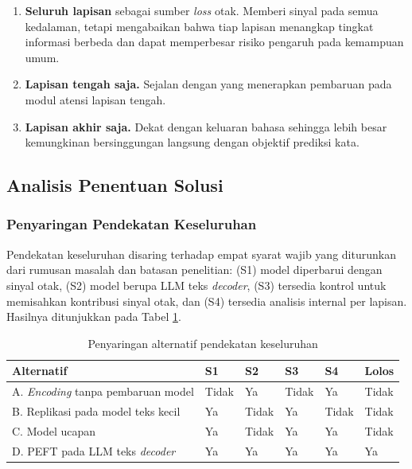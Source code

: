   \begin{enumerate}
      \item \textbf{Seluruh lapisan} sebagai sumber \textit{loss} otak. Memberi sinyal pada semua kedalaman, tetapi mengabaikan bahwa tiap lapisan menangkap tingkat informasi berbeda dan dapat memperbesar risiko pengaruh pada kemampuan umum.
      \item \textbf{Lapisan tengah saja.} Sejalan dengan \textcite{xiao2026beyond} yang menerapkan pembaruan pada modul atensi lapisan tengah.
      \item \textbf{Lapisan akhir saja.} Dekat dengan keluaran bahasa sehingga lebih besar kemungkinan bersinggungan langsung dengan objektif prediksi kata.
  \end{enumerate}

  \subsection{Analisis Penentuan Solusi}
  \label{sub:am_penentuan}

  \subsubsection{Penyaringan Pendekatan Keseluruhan}

  Pendekatan keseluruhan disaring terhadap empat syarat wajib yang diturunkan dari rumusan masalah dan batasan penelitian: (S1) model diperbarui dengan sinyal otak, (S2) model berupa LLM teks \textit{decoder}, (S3) tersedia kontrol untuk memisahkan kontribusi sinyal otak, dan (S4) tersedia analisis internal per lapisan. Hasilnya ditunjukkan pada Tabel \ref{tab:am_saring}.

  \begin{table}[h]
    \centering
    \caption{Penyaringan alternatif pendekatan keseluruhan}
    \label{tab:am_saring}
    \small
    \begin{tabularx}{\textwidth}{p{6cm} | X | X | X | X | X}
      \hline
      \textbf{Alternatif} & \textbf{S1} & \textbf{S2} & \textbf{S3} & \textbf{S4} & \textbf{Lolos} \\
      \hline
      A. \textit{Encoding} tanpa pembaruan model & Tidak & Ya & Tidak & Ya & Tidak \\
      B. Replikasi pada model teks kecil & Ya & Tidak & Ya & Tidak & Tidak \\
      C. Model ucapan & Ya & Tidak & Ya & Ya & Tidak \\
      D. PEFT pada LLM teks \textit{decoder} & Ya & Ya & Ya & Ya & Ya \\
      \hline
    \end{tabularx}
  \end{table}

